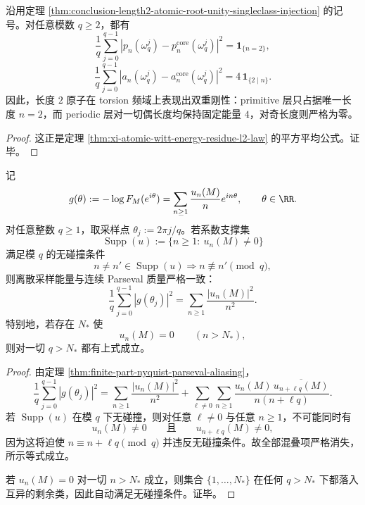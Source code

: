 \begin{corollary}\label{cor:conclusion-length2-atomic-torsion-energy-rigidity}
沿用定理 \ref{thm:conclusion-length2-atomic-root-unity-singleclass-injection} 的记号。对任意模数 \(q\ge 2\)，都有
\[
\frac1q\sum_{j=0}^{q-1}
\left|p_n(\omega_q^j)-p_n^{\mathrm{core}}(\omega_q^j)\right|^2
=
\mathbf 1_{\{n=2\}},
\]
\[
\frac1q\sum_{j=0}^{q-1}
\left|a_n(\omega_q^j)-a_n^{\mathrm{core}}(\omega_q^j)\right|^2
=
4\,\mathbf 1_{\{2\mid n\}}.
\]
因此，长度 \(2\) 原子在 torsion 频域上表现出双重刚性：primitive 层只占据唯一长度 \(n=2\)，而 periodic 层对一切偶长度均保持固定能量 \(4\)，对奇长度则严格为零。
\end{corollary}
\begin{proof}
这正是定理 \ref{thm:xi-atomic-witt-energy-residue-l2-law} 的平方平均公式。证毕。
\end{proof}

\begin{theorem}\label{thm:conclusion-torsion-sampling-nyquist-noalias-exactness}
记
\[
g(\theta):=-\log F_M(e^{i\theta})
=
\sum_{n\ge 1}\frac{u_n(M)}{n}e^{in\theta},
\qquad \theta\in\RR.
\]
对任意整数 \(q\ge 1\)，取采样点 \(\theta_j:=2\pi j/q\)。若系数支撑集
\[
\operatorname{Supp}(u):=\{n\ge 1:\ u_n(M)\neq 0\}
\]
满足模 \(q\) 的无碰撞条件
\[
n\neq n'\in \operatorname{Supp}(u)
\Longrightarrow
n\not\equiv n' \pmod q,
\]
则离散采样能量与连续 Parseval 质量严格一致：
\[
\frac1q\sum_{j=0}^{q-1}|g(\theta_j)|^2
=
\sum_{n\ge 1}\frac{|u_n(M)|^2}{n^2}.
\]
特别地，若存在 \(N_\ast\) 使
\[
u_n(M)=0\qquad (n>N_\ast),
\]
则对一切 \(q>N_\ast\) 都有上式成立。
\end{theorem}
\begin{proof}
由定理 \ref{thm:finite-part-nyquist-parseval-aliasing}，
\[
\frac1q\sum_{j=0}^{q-1}|g(\theta_j)|^2
=
\sum_{n\ge 1}\frac{|u_n(M)|^2}{n^2}
+
\sum_{\ell\neq 0}\sum_{n\ge 1}\frac{u_n(M)\,\overline{u_{n+\ell q}(M)}}{n(n+\ell q)}.
\]
若 \(\operatorname{Supp}(u)\) 在模 \(q\) 下无碰撞，则对任意 \(\ell\neq 0\) 与任意 \(n\ge 1\)，不可能同时有
\[
u_n(M)\neq 0
\qquad\text{且}\qquad
u_{n+\ell q}(M)\neq 0,
\]
因为这将迫使 \(n\equiv n+\ell q\pmod q\) 并违反无碰撞条件。故全部混叠项严格消失，所示等式成立。

若 \(u_n(M)=0\) 对一切 \(n>N_\ast\) 成立，则集合 \(\{1,\dots,N_\ast\}\) 在任何 \(q>N_\ast\) 下都落入互异的剩余类，因此自动满足无碰撞条件。证毕。
\end{proof}

